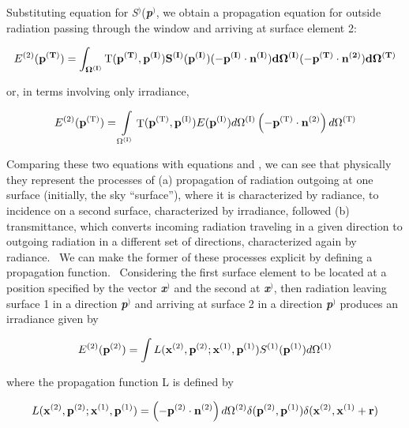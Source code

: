 Substituting equation for \emph{S}\(^{)}\)(\textbf{\emph{p}}\(^{)}\), we obtain a propagation equation for outside radiation passing through the window and arriving at surface element 2:

\begin{equation}
E^{(2)}(\bf{p}^{(T)}) = \int_{\Omega^{(I)}} 
      \rm T (\bf{p}^{(T)},\bf{p}^{(I)}) 
      S^{(I)}(\bf{p}^{(I)})(-\bf{p}^{(I)}\cdot\bf{n}^{(I)})
      d\Omega^{(I)}(-\bf{p}^{(T)}\cdot\bf{n}^{(2)})d\Omega^{(T)}
\end{equation}

or, in terms involving only irradiance,

\begin{equation}
{E^{{\rm{(2)}}}}({{\bf{p}}^{{\rm{(T)}}}}) = \int\limits_{{\Omega ^{{\rm{(I)}}}}} {{\mathop{\rm T}\nolimits} ({{\bf{p}}^{{\rm{(T)}}}},{{\bf{p}}^{{\rm{(I)}}}})E({{\bf{p}}^{{\rm{(I)}}}})d{\Omega ^{{\rm{(I)}}}}} \left( { - {{\bf{p}}^{{\rm{(T)}}}} \cdot {{\bf{n}}^{{\rm{(2)}}}}} \right)d{\Omega ^{{\rm{(T)}}}}
\end{equation}

Comparing these two equations with equations and , we can see that physically they represent the processes of (a) propagation of radiation outgoing at one surface (initially, the sky ``surface''), where it is characterized by radiance, to incidence on a second surface, characterized by irradiance, followed (b) transmittance, which converts incoming radiation traveling in a given direction to outgoing radiation in a different set of directions, characterized again by radiance.~ We can make the former of these processes explicit by defining a propagation function.~ Considering the first surface element to be located at a position specified by the vector \textbf{\emph{x}}\(^{)}\) and the second at \textbf{\emph{x}}\(^{)}\), then radiation leaving surface 1 in a direction \textbf{\emph{p}}\(^{)}\) and arriving at surface 2 in a direction \textbf{\emph{p}}\(^{)}\) produces an irradiance given by

\begin{equation}
{E^{(2)}}({{\bf{p}}^{{\rm{(2)}}}}) = \int {L({{\bf{x}}^{{\rm{(2)}}}},{{\bf{p}}^{{\rm{(2)}}}};{{\bf{x}}^{{\rm{(1)}}}},{{\bf{p}}^{{\rm{(1)}}}}){S^{{\rm{(1)}}}}({{\bf{p}}^{{\rm{(1)}}}})} d{\Omega ^{{\rm{(1)}}}}
\end{equation}

where the propagation function L is defined by

\begin{equation}
L({{\bf{x}}^{{\rm{(2)}}}},{{\bf{p}}^{{\rm{(2)}}}};{{\bf{x}}^{{\rm{(1)}}}},{{\bf{p}}^{{\rm{(1)}}}}) = \left( { - {{\bf{p}}^{{\rm{(2)}}}}\cdot {{\bf{n}}^{{\rm{(2)}}}}} \right)d{\Omega ^{{\rm{(2)}}}}\delta ({{\bf{p}}^{{\rm{(2)}}}},{{\bf{p}}^{{\rm{(1)}}}})\delta ({{\bf{x}}^{{\rm{(2)}}}},{{\bf{x}}^{{\rm{(1)}}}} + {\bf{r}})
\end{equation}

